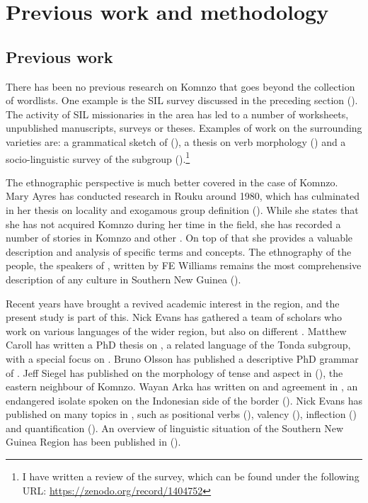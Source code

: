 \section{Previous work and methodology}\label{prevmethod}

\subsection{Previous work}\label{previouswork}

There has been no previous research on Komnzo that goes beyond the collection of wordlists. One example is the SIL survey discussed in the preceding section (\citealt{Clifton:1991fly}). The activity of SIL missionaries in the area has led to a number of  worksheets, unpublished manuscripts, surveys or theses. Examples of work on the surrounding varieties are: a grammatical sketch of  (\citealt{Bouve:2003ar}), a thesis on  verb morphology (\citealt{Sarsa2001:wa}) and a socio-linguistic survey of the  subgroup (\citealt{Grummit:2012sur}).\footnote{I have written a review of the survey, which can be found under the following URL: \url{https://zenodo.org/record/1404752}}%

The ethnographic perspective is much better covered in the case of Komnzo. Mary Ayres has conducted research in Rouku around 1980, which has culminated in her thesis on locality and exogamous group definition (\citealt{Ayres:ws}). While she states that she has not acquired Komnzo during her time in the field, she has recorded a number of stories in Komnzo and other . On top of that she provides a valuable description and analysis of specific terms and concepts. The ethnography of the  people, the speakers of , written by FE Williams remains the most comprehensive description of any culture in Southern New Guinea (\citealt{Williams:1936transfly}).%

Recent years have brought a revived academic interest in the region, and the present study is part of this. Nick Evans has gathered a team of scholars who work on various languages of the wider region, but also on different . Matthew Caroll has written a PhD thesis on , a related language of the Tonda subgroup, with a special focus on  \citep{Carroll:Ngkolmpu}. Bruno Olsson has published a descriptive PhD grammar of  \citep{Olsson:Marind}. Jeff Siegel has published on the morphology of tense and aspect in  (\citealt{Siegel:2015bp}), the eastern neighbour of Komnzo. Wayan Arka has written on  and agreement in , an endangered isolate spoken on the Indonesian side of the border (\citealt{Arka:2012tt}). Nick Evans has published on many topics in , such as positional verbs (\citealt{Evans:2014bz}), valency (\citealt{Evans:2015wy}), inflection (\citealt{Evans:2015to}) and quantification (\citealt{Evans:quant}). An overview of linguistic situation of the Southern New Guinea Region has been published in (\citealt{Evans:sng}).

